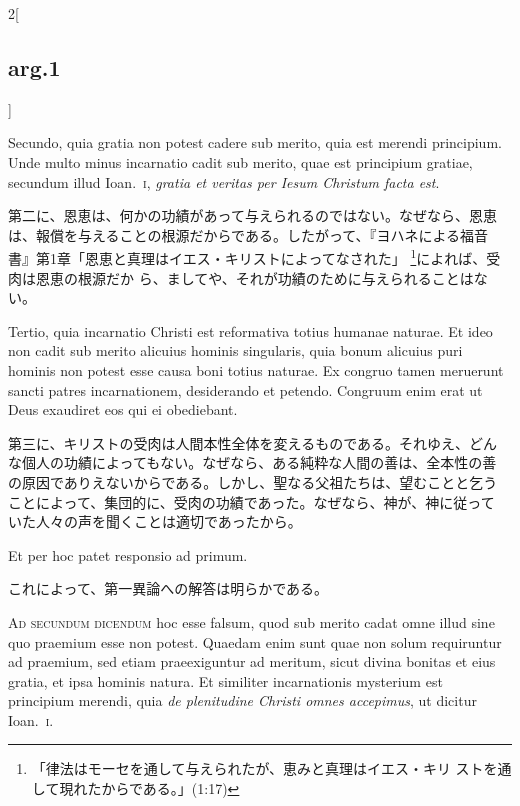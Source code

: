 \documentclass[paper=a4paper,fontsize=10pt,jafontsize=9pt,titlepage]{jlreq}
\begin{document}
\begin{paracol}{2}[\subsection{arg.1}]
\switchcolumn*

Secundo, quia gratia non potest cadere sub merito, quia est merendi
principium. Unde multo minus incarnatio cadit sub merito, quae est
principium gratiae, secundum illud Ioan.~{\scshape i}, {\itshape
gratia et veritas per Iesum Christum facta est}.

\switchcolumn

第二に、恩恵は、何かの功績があって与えられるのではない。なぜなら、恩恵
は、報償を与えることの根源だからである。したがって、『ヨハネによる福音
書』第1章「恩恵と真理はイエス・キリストによってなされた」
\footnote{「律法はモーセを通して与えられたが、恵みと真理はイエス・キリ
ストを通して現れたからである。」(1:17)}によれば、受肉は恩恵の根源だか
ら、ましてや、それが功績のために与えられることはない。

\switchcolumn*

Tertio, quia incarnatio Christi est reformativa totius humanae
naturae. Et ideo non cadit sub merito alicuius hominis singularis,
quia bonum alicuius puri hominis non potest esse causa boni totius
naturae. Ex congruo tamen meruerunt sancti patres incarnationem,
desiderando et petendo. Congruum enim erat ut Deus exaudiret eos qui
ei obediebant.

\switchcolumn

第三に、キリストの受肉は人間本性全体を変えるものである。それゆえ、どん
な個人の功績によってもない。なぜなら、ある純粋な人間の善は、全本性の善
の原因でありえないからである。しかし、聖なる父祖たちは、望むことと乞う
ことによって、集団的に、受肉の功績であった。なぜなら、神が、神に従って
いた人々の声を聞くことは適切であったから。

\switchcolumn*

Et per hoc patet responsio ad primum.

\switchcolumn

これによって、第一異論への解答は明らかである。

\switchcolumn*[\subsection{ad.2}]

{\scshape Ad secundum dicendum} hoc esse falsum, quod sub merito cadat
omne illud sine quo praemium esse non potest. Quaedam enim sunt quae
non solum requiruntur ad praemium, sed etiam praeexiguntur ad meritum,
sicut divina bonitas et eius gratia, et ipsa hominis natura. Et
similiter incarnationis mysterium est principium merendi, quia
{\itshape de plenitudine Christi omnes accepimus}, ut dicitur
Ioan.~{\scshape i}.


\end{paracol}
\end{document}
